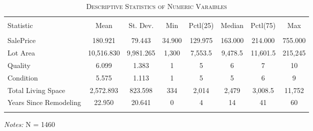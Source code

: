 \documentclass[a4paper]{article}
\begin{document}
\begin{table}[!htbp] 
\begin{adjustwidth}{-0cm}{-0cm}
\begin{threeparttable}
\small
\captionsetup{font=small, justification=raggedright,singlelinecheck=false}
\caption{\textsc{Descriptive Statistics of Numeric Varaibles}}
\centering 
  \label{}   
\begin{tabular}{@{\extracolsep{1pt}}lccccccc} 
\\[-5ex]\hline 
\hline \\[-1.8ex] 
Statistic & \multicolumn{1}{c}{Mean} & \multicolumn{1}{c}{St. Dev.} & \multicolumn{1}{c}{Min} & \multicolumn{1}{c}{Pctl(25)} & \multicolumn{1}{c}{Median} & \multicolumn{1}{c}{Pctl(75)} & \multicolumn{1}{c}{Max} \\ 
\hline \\[-1.8ex] 
SalePrice & 180.921 & 79.443 & 34.900 & 129.975 & 163.000 & 214.000 & 755.000 \\ 
Lot Area & 10,516.830 & 9,981.265 & 1,300 & 7,553.5 & 9,478.5 & 11,601.5 & 215,245 \\ 
Quality & 6.099 & 1.383 & 1 & 5 & 6 & 7 & 10 \\ 
Condition & 5.575 & 1.113 & 1 & 5 & 5 & 6 & 9 \\ 
Total Living Space & 2,572.893 & 823.598 & 334 & 2,014 & 2,479 & 3,008.5 & 11,752 \\ 
Years Since Remodeling & 22.950 & 20.641 & 0 & 4 & 14 & 41 & 60 \\ 
\hline \\[-3.5ex] 
\end{tabular} 
\begin{tablenotes}
      \small
      \item\textit{Notes:} N = 1460
    \end{tablenotes}
\end{threeparttable}
\end{adjustwidth}
\end{table}
\end{document}
